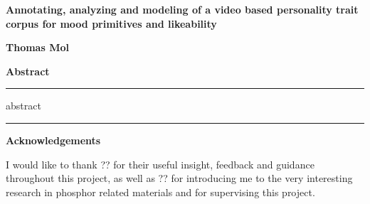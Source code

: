 \thispagestyle{plain}
\begin{center}
    \Large
    \textsf{
        \textbf{
            Annotating, analyzing and modeling of a video based personality trait corpus for mood primitives and likeability
        }
    }
    
    \large
    \vspace{0.4cm}
    \textbf{Thomas Mol}
   
    \vspace{0.9cm}
    \Large
    \textsf{
        \textbf{Abstract}
    }
\end{center}

\hrule
\vspace{6pt}
abstract
\vspace{6pt}
\hrule

\vfill

\begin{center}
    \Large
    \textsf{
        \textbf{Acknowledgements}
    }
\end{center}
I would like to thank ?? for their useful insight, feedback and guidance throughout this project, as well as ?? for introducing me to the very interesting research in phosphor related materials and for supervising this project.